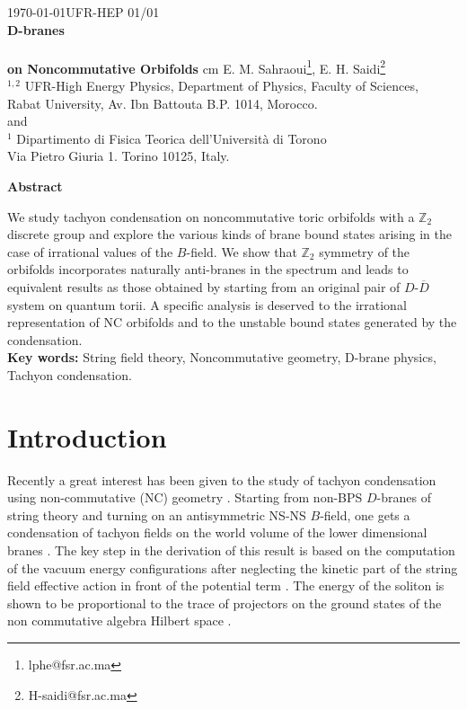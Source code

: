 \documentclass[a4paper,12pt]{article}
\begin{document}
\begin{titlepage}
\begin{center}
 \today \hfill UFR-HEP 01/01\\
\vskip 2cm {\LARGE {\bf D-branes \\ ~\\ \bf on
Noncommutative Orbifolds}}
  cm
 {\large E. M. Sahraoui\footnote{lphe@fsr.ac.ma}, E.
H. Saidi\footnote{H-saidi@fsr.ac.ma} }\\
 \vskip 0.5cm $^{1,2}$ UFR-High Energy Physics, Department of
Physics, Faculty of Sciences,\\ Rabat University, Av. Ibn Battouta
B.P. 1014, Morocco.\\
\bigskip
 and
\\
\vskip 0.5cm $^1$ Dipartimento di Fisica Teorica dell'Universit\`a
di Torono\\ Via Pietro Giuria 1. Torino 10125, Italy.

\vskip 1cm
{\bf  Abstract}
\end{center}
We study tachyon condensation on noncommutative toric orbifolds
with a $\mathbb{Z}_{2}$
 discrete group and explore the various kinds of brane bound states
arising in the case of irrational values of the $B$-field. We show
that $\mathbb{Z}_{2}$ symmetry of the orbifolds incorporates
naturally anti-branes in the spectrum and leads to equivalent
results as those obtained by starting from an original pair of
$D$-$\overline{D}$  system on quantum torii. A specific analysis
is deserved to the irrational representation of NC orbifolds and
to the unstable bound states generated by the condensation.\\
\vskip 0.5cm {\bf Key words:} String field theory, Noncommutative
geometry, D-brane physics, Tachyon condensation.
\end{titlepage}
\newpage

\section{Introduction}

Recently a great interest has been given to the study of tachyon
condensation using non-commutative (NC) geometry \cite{a}.
 Starting from non-BPS $D$-branes of string theory and turning
on an antisymmetric NS-NS $B$-field, one gets a condensation of
tachyon fields on the world volume of the lower dimensional branes
\cite{b}. The key step in the derivation of this result is based
on the computation of the vacuum energy configurations after
neglecting the kinetic part of the string field effective action
in front of the potential term
 \cite{c}. The energy of the soliton is shown to
be proportional to the trace of projectors on the ground states of the non
commutative algebra Hilbert space \cite{d}.
\end{document}
